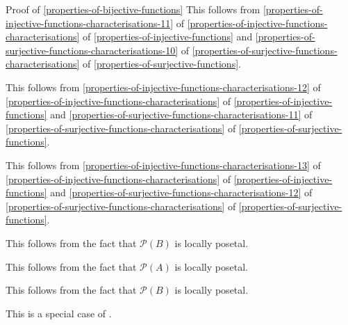 \begin{Proof}{Proof of \cref{properties-of-bijective-functions}}
    This follows from \cref{properties-of-injective-functions-characterisations-11} of \cref{properties-of-injective-functions-characterisations} of \cref{properties-of-injective-functions} and \cref{properties-of-surjective-functions-characterisations-10} of \cref{properties-of-surjective-functions-characterisations} of \cref{properties-of-surjective-functions}.

    This follows from \cref{properties-of-injective-functions-characterisations-12} of \cref{properties-of-injective-functions-characterisations} of \cref{properties-of-injective-functions} and \cref{properties-of-surjective-functions-characterisations-11} of \cref{properties-of-surjective-functions-characterisations} of \cref{properties-of-surjective-functions}.

    This follows from \cref{properties-of-injective-functions-characterisations-13} of \cref{properties-of-injective-functions-characterisations} of \cref{properties-of-injective-functions} and \cref{properties-of-surjective-functions-characterisations-12} of \cref{properties-of-surjective-functions-characterisations} of \cref{properties-of-surjective-functions}.

    This follows from the fact that $\mathcal{P}(B)$ is locally posetal.

    This follows from the fact that $\mathcal{P}(A)$ is locally posetal.

    This follows from the fact that $\mathcal{P}(B)$ is locally posetal.

    This is a special case of .
\end{Proof}
\begin{appendices}

\end{appendices}


